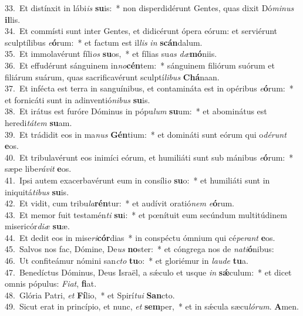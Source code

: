 {33.~}Et distínxit in lábi\textit{is} \textbf{su}is:~* non disperdidérunt Gentes, quas dixit Dó\textit{mi}\textit{nus} \textbf{il}lis.\\
{34.~}Et commísti sunt inter Gentes, et didicérunt ópera eórum: et serviérunt sculptílibus \textit{e}\textbf{ó}rum:~* et factum est il\textit{lis} \textit{in} \textbf{scán}dalum.\\
{35.~}Et immolavérunt fíli\textit{os} \textbf{su}os,~* et fílias su\textit{as} \textit{dæ}\textbf{mó}niis.\\
{36.~}Et effudérunt sánguinem in\textit{no}\textbf{cén}tem:~* sánguinem filiórum suórum et filiárum suárum, quas sacrificavérunt sculptí\textit{li}\textit{bus} \textbf{Chá}naan.\\
{37.~}Et infécta est terra in sanguínibus, et contamináta est in opéribus \textit{e}\textbf{ó}rum:~* et fornicáti sunt in adinventió\textit{ni}\textit{bus} \textbf{su}is.\\
{38.~}Et irátus est furóre Dóminus in pópu\textit{lum} \textbf{su}um:~* et abominátus est heredi\textit{tá}\textit{tem} \textbf{su}am.\\
{39.~}Et trádidit eos in ma\textit{nus} \textbf{Gén}tium:~* et domináti sunt eórum qui o\textit{dé}\textit{runt} \textbf{e}os.\\
{40.~}Et tribulavérunt eos inimíci eórum, et humiliáti sunt sub mánibus \textit{e}\textbf{ó}rum:~* sæpe libe\textit{rá}\textit{vit} \textbf{e}os.\\
{41.~}Ipsi autem exacerbavérunt eum in consíli\textit{o} \textbf{su}o:~* et humiliáti sunt in iniquitá\textit{ti}\textit{bus} \textbf{su}is.\\
{42.~}Et vidit, cum tribu\textit{la}\textbf{rén}tur:~* et audívit oratió\textit{nem} \textit{e}\textbf{ó}rum.\\
{43.~}Et memor fuit testamén\textit{ti} \textbf{su}i:~* et pœnítuit eum secúndum multitúdinem misericór\textit{di}\textit{æ} \textbf{su}æ.\\
{44.~}Et dedit eos in mise\textit{ri}\textbf{cór}dias~* in conspéctu ómnium qui cé\textit{pe}\textit{rant} \textbf{e}os.\\
{45.~}Salvos nos fac, Dómine, De\textit{us} \textbf{no}ster:~* et cóngrega nos de \textit{na}\textit{ti}\textbf{ó}nibus:\\
{46.~}Ut confiteámur nómini san\textit{cto} \textbf{tu}o:~* et gloriémur in \textit{lau}\textit{de} \textbf{tu}a.\\
{47.~}Benedíctus Dóminus, Deus Israël, a sǽculo et usque \textit{in} \textbf{sǽ}culum:~* et dicet omnis pópulus: \textit{Fi}\textit{at}, \textbf{fi}at.\\
{48.~}Glória Patri, \textit{et} \textbf{Fí}lio,~* et Spirí\textit{tu}\textit{i} \textbf{San}cto.\\
{49.~}Sicut erat in princípio, et nunc, \textit{et} \textbf{sem}per,~* et in sǽcula sæcu\textit{ló}\textit{rum}. \textbf{A}men.\\
